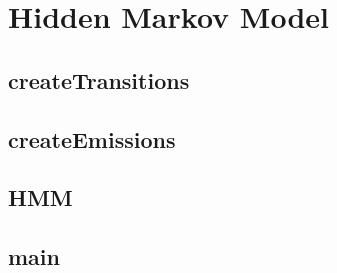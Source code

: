 \documentclass[12pt]{article}
\begin{document}
\section{Hidden Markov Model}

\subsection{createTransitions}
\subsection{createEmissions}
\subsection{HMM}
\subsection{main}
\end{document}
